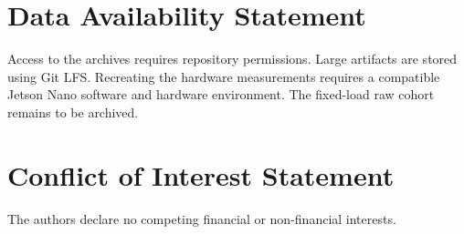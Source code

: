 \documentclass[11pt,a4paper]{article}
\begin{document}
\section*{Data Availability Statement}
Access to the archives requires repository permissions. Large artifacts are stored using Git LFS. Recreating the hardware measurements requires a compatible Jetson Nano software and hardware environment. The fixed-load raw cohort remains to be archived.

\section*{Conflict of Interest Statement}
The authors declare no competing financial or non-financial interests.



\end{document}
